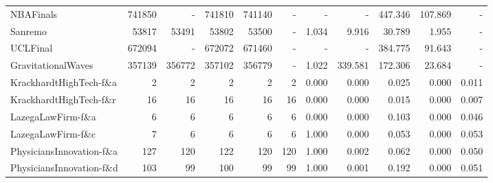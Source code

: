 \begin{table*}[!htbp]
\begin{tabular}{lrrrrrrrrrr}
NBAFinals & 741850 & - & 741810 & 741140 & - & - & - & 447.346 & 107.869 & - \\
Sanremo & 53817 & 53491 & 53802 & 53500 & - & 1.034 & 9.916 & 30.789 & 1.955 & - \\
UCLFinal & 672094 & - & 672072 & 671460 & - & - & - & 384.775 & 91.643 & - \\
GravitationalWaves & 357139 & 356772 & 357102 & 356779 & - & 1.022 & 339.581 & 172.306 & 23.684 & - \\
KrackhardtHighTech-f\&a & 2 & 2 & 2 & 2 & 2 & 0.000 & 0.000 & 0.025 & 0.000 & 0.011 \\
KrackhardtHighTech-f\&r & 16 & 16 & 16 & 16 & 16 & 0.000 & 0.000 & 0.015 & 0.000 & 0.007 \\
LazegaLawFirm-f\&a & 6 & 6 & 6 & 6 & 6 & 0.000 & 0.000 & 0.103 & 0.000 & 0.046 \\
LazegaLawFirm-f\&c & 7 & 6 & 6 & 6 & 6 & 1.000 & 0.000 & 0.053 & 0.000 & 0.053 \\
PhysiciansInnovation-f\&a & 127 & 120 & 122 & 120 & 120 & 1.000 & 0.002 & 0.062 & 0.000 & 0.050 \\
PhysiciansInnovation-f\&d & 103 & 99 & 100 & 99 & 99 & 1.000 & 0.001 & 0.192 & 0.000 & 0.051 \\
\bottomrule
\end{tabular}
\end{table*}

